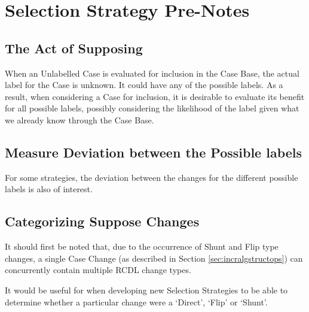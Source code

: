 \documentclass[a4paper,11pt]{report}
\begin{document}
\section{Selection Strategy Pre-Notes}
\subsection{The Act of Supposing}
When an Unlabelled Case is evaluated for inclusion in the Case Base, the actual label for the Case is unknown. It could have any of the possible labels. As a result, when considering a Case for inclusion, it is desirable to evaluate its benefit for all possible labels, possibly considering the likelihood of the label given what we already know through the Case Base.

\subsection{Measure Deviation between the Possible labels}
For some strategies, the deviation between the changes for the different possible labels is also of interest.

\subsection{Categorizing Suppose Changes}
It should first be noted that, due to the occurrence of Shunt and Flip type changes, a single Case Change (as described in Section \ref{sec:incralgstructops}) can concurrently contain multiple RCDL change types.

It would be useful for when developing new Selection Strategies to be able to determine whether a particular change were a `Direct', `Flip' or `Shunt'.
\end{document}
